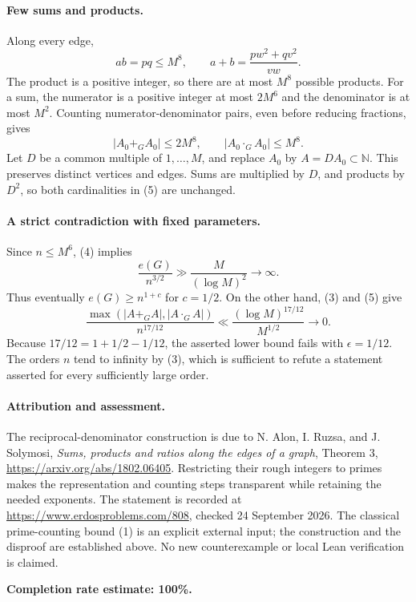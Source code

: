\paragraph{Few sums and products.}
Along every edge,
\[
 ab=pq\leq M^8,\qquad
 a+b=\frac{pw^2+qv^2}{vw}.
\]
The product is a positive integer, so there are at most \(M^8\) possible products. For a sum, the numerator is a positive integer at most \(2M^6\) and the denominator is at most \(M^2\). Counting numerator-denominator pairs, even before reducing fractions, gives
\[
 |A_0+_GA_0|\leq2M^8,\qquad
 |A_0\cdot_GA_0|\leq M^8.
\tag{5}
\]
Let \(D\) be a common multiple of \(1,\ldots,M\), and replace \(A_0\) by \(A=DA_0\subset\mathbb N\). This preserves distinct vertices and edges. Sums are multiplied by \(D\), and products by \(D^2\), so both cardinalities in (5) are unchanged.

\paragraph{A strict contradiction with fixed parameters.}
Since \(n\leq M^6\), (4) implies
\[
 \frac{e(G)}{n^{3/2}}\gg\frac{M}{(\log M)^2}\longrightarrow\infty.
\]
Thus eventually \(e(G)\geq n^{1+c}\) for \(c=1/2\). On the other hand, (3) and (5) give
\[
 \frac{\max(|A+_GA|,|A\cdot_GA|)}{n^{17/12}}
 \ll\frac{(\log M)^{17/12}}{M^{1/2}}
 \longrightarrow0.
\]
Because \(17/12=1+1/2-1/12\), the asserted lower bound fails with \(\epsilon=1/12\). The orders \(n\) tend to infinity by (3), which is sufficient to refute a statement asserted for every sufficiently large order.

\paragraph{Attribution and assessment.}
The reciprocal-denominator construction is due to N. Alon, I. Ruzsa, and J. Solymosi, \emph{Sums, products and ratios along the edges of a graph}, Theorem 3, \url{https://arxiv.org/abs/1802.06405}. Restricting their rough integers to primes makes the representation and counting steps transparent while retaining the needed exponents. The statement is recorded at \url{https://www.erdosproblems.com/808}, checked 24 September 2026. The classical prime-counting bound (1) is an explicit external input; the construction and the disproof are established above. No new counterexample or local Lean verification is claimed.

\textbf{Completion rate estimate: 100\%.}
